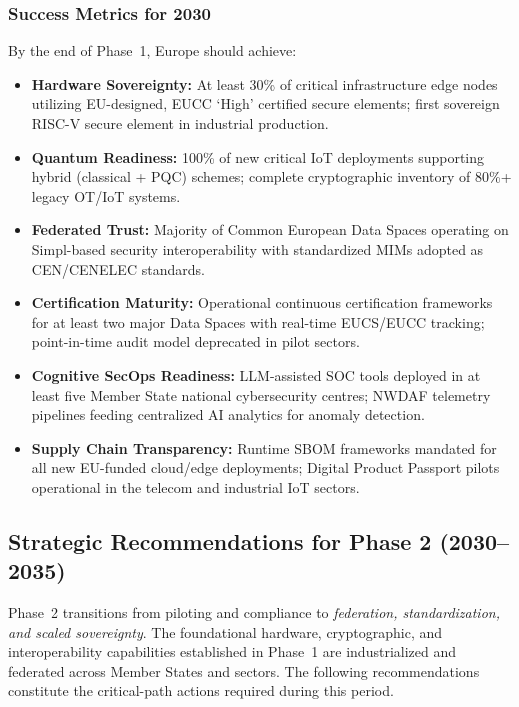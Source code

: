 \documentclass{ieeeaccess}
\begin{document}
\subsubsection*{Success Metrics for 2030}
By the end of Phase~1, Europe should achieve:
\begin{itemize}
    \item \textbf{Hardware Sovereignty:}
    At least 30\% of critical infrastructure edge nodes utilizing EU-designed, EUCC `High'
    certified secure elements; first sovereign RISC-V secure element in industrial
    production.

    \item \textbf{Quantum Readiness:}
    100\% of new critical IoT deployments supporting hybrid (classical + PQC) schemes;
    complete cryptographic inventory of 80\%+ legacy OT/IoT systems.

    \item \textbf{Federated Trust:}
    Majority of Common European Data Spaces operating on Simpl-based security
    interoperability with standardized MIMs adopted as CEN/CENELEC standards.

    \item \textbf{Certification Maturity:}
    Operational continuous certification frameworks for at least two major Data Spaces with
    real-time EUCS/EUCC tracking; point-in-time audit model deprecated in pilot sectors.

    \item \textbf{Cognitive SecOps Readiness:}
    LLM-assisted SOC tools deployed in at least five Member State national cybersecurity
    centres; NWDAF telemetry pipelines feeding centralized AI analytics for anomaly
    detection.

    \item \textbf{Supply Chain Transparency:}
    Runtime SBOM frameworks mandated for all new EU-funded cloud/edge deployments; Digital
    Product Passport pilots operational in the telecom and industrial IoT sectors.
\end{itemize}


\subsection*{Strategic Recommendations for Phase 2 (2030--2035)}
Phase~2 transitions from piloting and compliance to \emph{federation, standardization, and
scaled sovereignty}. The foundational hardware, cryptographic, and interoperability
capabilities established in Phase~1 are industrialized and federated across Member States
and sectors. The following recommendations constitute the critical-path actions required
during this period.
\end{document}

